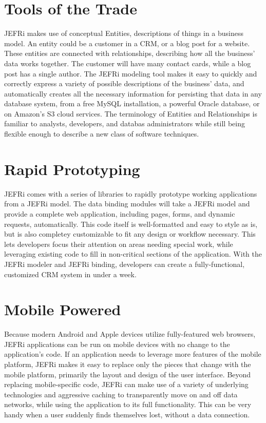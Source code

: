 \documentclass{article}
\begin{document}
\section{Tools of the Trade}
JEFRi makes use of conceptual Entities, descriptions of things in a business
model. An entity could be a customer in a CRM, or a blog post for a website.
These entities are connected with relationships, describing how all the
business' data works together. The customer will have many contact cards, while
a blog post has a single author. The JEFRi modeling tool makes it easy to
quickly and correctly express a variety of possible descriptions of the
business' data, and automatically creates all the necessary information for
persisting that data in any database system, from a free MySQL installation, a
powerful Oracle database, or on Amazon's S3 cloud services. The terminology of
Entities and Relationships is familiar to analysts, developers, and databas
administrators while still being flexible enough to describe a new class of
software techniques.

\section{Rapid Prototyping}
JEFRi comes with a series of libraries to rapidly prototype working applications
from a JEFRi model. The data binding modules will take a JEFRi model and provide
a complete web application, including pages, forms, and dynamic requests,
automatically. This code itself is well-formatted and easy to style as is, but
is also completey customizable to fit any design or workflow necessary. This
lets developers focus their attention on areas needing special work, while
leveraging existing code to fill in non-critical sections of the application.
With the JEFRi modeler and JEFRi binding, developers can create a
fully-functional, customized CRM system in under a week.

\section{Mobile Powered}
Because modern Android and Apple devices utilize fully-featured web browsers,
JEFRi applications can be run on mobile devices with no change to the
application's code. If an application needs to leverage more features of the
mobile platform, JEFRi makes it easy to replace only the pieces that change with
the mobile platform, primarily the layout and design of the user interface.
Beyond replacing mobile-specific code, JEFRi can make use of a variety of
underlying technologies and aggressive caching to transparently move on and off
data networks, while using the application to its full functionality. This can
be very handy when a user suddenly finds themselves lost, without a data
connection.
\end{document}
